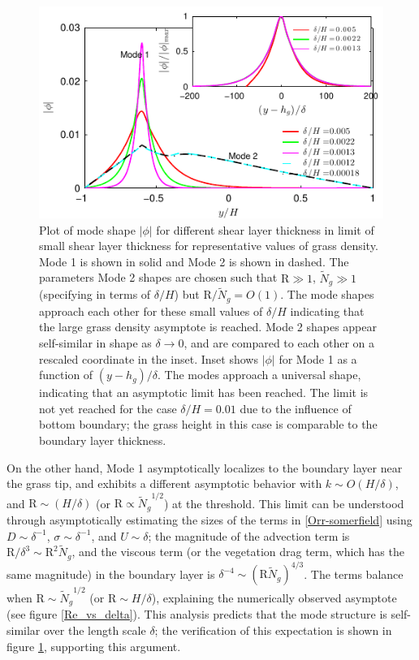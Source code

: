 \documentclass[aps,prl,reprint,twocolumn,showpacs,superscriptaddress,10pt]{revtex4-1}  %
\newcommand{\hg}{h_g}
\newcommand{\Rey}{\text{R}}
\newcommand{\Ndg}{\tilde{N}_g}
\begin{document}
\begin{figure}
\includegraphics[]{Asymptotic_noshear}
\caption{Plot of mode shape $|\phi|$ for different shear layer thickness in limit of small shear layer thickness for representative values of grass density. Mode 1 is shown in solid and Mode 2 is shown in dashed. The parameters Mode 2 shapes are chosen such that $\Rey \gg 1$, $\Ndg \gg 1$ (specifying in terms of $\delta/H$) but $\Rey/\Ndg = O(1)$. The mode shapes approach each other for these small values of $\delta/H$ indicating that the large grass density asymptote is reached. Mode 2 shapes appear self-similar in shape as $\delta\to 0$, and are compared to each other on a rescaled coordinate in the inset. Inset shows $|\phi|$ for Mode 1 as a function of $(y-\hg)/\delta$. The modes approach a universal shape, indicating that an asymptotic limit has been reached. The limit is not yet reached for the case $\delta/H = 0.01$ due to the influence of bottom boundary; the grass height in this case is comparable to the boundary layer thickness.}
\label{Asymptotic_mode}
\end{figure}

On the other hand, Mode 1 asymptotically localizes to the boundary layer near the grass tip, and exhibits a different asymptotic behavior with $k \sim O(H/\delta)$, and $\Rey \sim (H/\delta)$ (or $\Rey \propto {\Ndg}^{1/2}$) at the threshold. 
This limit can be understood through asymptotically estimating the sizes of the terms in \eqref{Orr-somerfield} using $D\sim \delta^{-1}$, $\sigma \sim \delta^{-1}$, and $U\sim \delta$; the magnitude of the advection term is $\Rey/\delta^3 \sim \Rey^2 \Ndg $, and the viscous term (or the vegetation drag term, which has the same magnitude) in the boundary layer is $\delta^{-4} \sim (\Rey \Ndg)^{4/3}$. The terms balance when $\Rey \sim {\Ndg}^{1/2}$ (or $\Rey \sim H/\delta$), explaining the numerically observed asymptote (see figure \ref{Re_vs_delta}). This analysis predicts that the mode structure is self-similar over the length scale $\delta$; the verification of this expectation is shown in figure \ref{Asymptotic_mode}, supporting this argument.
\end{document}
